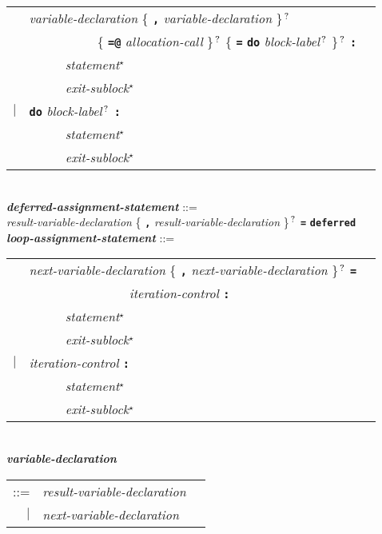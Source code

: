\documentclass[12pt]{article}
\newcommand{\TT}[1]{{\tt \bfseries #1}}
\newcommand{\STAR}{{\Large $^\star$}}
\newcommand{\QMARK}{{$^{\,\mbox{\footnotesize ?}}$}}
\newcommand{\ttkey}[1]{{\tt \bfseries #1}}
\newcommand{\emkey}[1]{{\em \bfseries #1}}
\newenvironment{indpar}[1][0.3in]%
	{\begin{list}{}%
		     {\setlength{\itemsep}{0in}%
		      \setlength{\topsep}{0in}%
		      \setlength{\parsep}{1ex}%
		      \setlength{\labelwidth}{#1}%
		      \setlength{\leftmargin}{#1}%
		      \addtolength{\leftmargin}{\labelsep}}%
	 \item}%
	{\end{list}}
\begin{document}
\begin{indpar}
\hspace*{0.5in}
    \begin{tabular}[t]{@{}rll}
        & {\em variable-declaration}
                \{ \TT{,} {\em variable-declaration} \}\QMARK{} \\
	& ~~~~~~~~~~ \{ \TT{=@} {\em allocation-call} \}\QMARK{}
		\{ \TT{=}
		   \ttkey{do} {\em block-label}\QMARK{} \}\QMARK{} \TT{:} \\
        & ~~~~~ {\em statement}\STAR{} \\
        & ~~~~~ {\em exit-sublock}\STAR{} \\
    $|$ & \ttkey{do} {\em block-label}\QMARK{} \TT{:} \\
        & ~~~~~ {\em statement}\STAR{} \\
        & ~~~~~ {\em exit-sublock}\STAR{} \\
    \end{tabular}
\\[0.5ex]
\emkey{deferred-assignment-statement} ::= \\
\hspace*{0.5in}
        {\em result-variable-declaration}
	    \{ \TT{,} {\em result-variable-declaration} \}\QMARK{}
	    \TT{=} \ttkey{deferred}
\\[0.5ex]
\emkey{loop-assignment-statement} ::= \\
\hspace*{0.5in}
    \begin{tabular}[t]{@{}rll}
        & {\em next-variable-declaration}
                \{ \TT{,} {\em next-variable-declaration} \}\QMARK{}
		\TT{=} \\
	& ~~~~~~~~~~~~~~~ {\em iteration-control} \TT{:} \\
        & ~~~~~ {\em statement}\STAR{} \\
        & ~~~~~ {\em exit-sublock}\STAR{} \\
    $|$ & {\em iteration-control} \TT{:} \\
        & ~~~~~ {\em statement}\STAR{} \\
        & ~~~~~ {\em exit-sublock}\STAR{} \\
    \end{tabular}
\\[0.5ex]
\emkey{variable-declaration}
    \begin{tabular}[t]{@{}rll}
    ::= & {\em result-variable-declaration} \\
    $|$ & {\em next-variable-declaration} \\
    \end{tabular}

\end{indpar}
\end{document}
